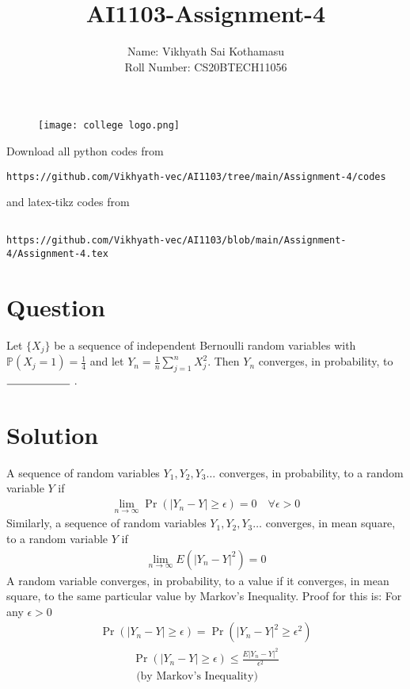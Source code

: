 \documentclass[journal,12pt,twocolumn]{IEEEtran}
\begin{document}
\title{AI1103-Assignment-4}
\author{Name: Vikhyath Sai Kothamasu\\Roll Number: CS20BTECH11056}
\maketitle
\newpage
\bigskip
\renewcommand{\thefigure}{\theenumi}
\renewcommand{\thetable}{\theenumi}

\begin{figure} [h]
    \texttt{[image: college logo.png]}
\end{figure}

Download all python codes from 
\begin{lstlisting}
https://github.com/Vikhyath-vec/AI1103/tree/main/Assignment-4/codes
\end{lstlisting}
%
and latex-tikz codes from 
%
\begin{lstlisting}

https://github.com/Vikhyath-vec/AI1103/blob/main/Assignment-4/Assignment-4.tex
\end{lstlisting}
\section*{Question}
Let $\{X_j\}$ be a sequence of independent Bernoulli random variables with $\mathbb{P}(X_j=1) = \frac{1}{4}$ and let $Y_n = \frac{1}{n} \sum_{j=1}^{n}X_j^2$. Then $Y_n$ converges, in probability, to $\rule{2cm}{0.15mm}$ .

\section*{Solution}
A sequence of random variables $Y_1,Y_2,Y_3\hdots$ converges, in probability, to a random variable $Y$ if
\begin{align}
    \lim_{n\rightarrow \infty}\Pr{(|Y_n-Y|\geq \epsilon)} = 0 \quad \forall \epsilon >0
\end{align}
Similarly, a sequence of random variables $Y_1,Y_2,Y_3\hdots$ converges, in mean square, to a random variable $Y$ if
\begin{align}
    \lim_{n\rightarrow \infty} E(|Y_n-Y|^2) = 0 
\end{align}
A random variable converges, in probability, to a value if it converges, in mean square, to the same particular value by Markov's Inequality. Proof for this is: For any $\epsilon > 0$
\begin{align}
    \Pr{(|Y_n-Y|\geq \epsilon)} = \Pr{(|Y_n-Y|^2\geq \epsilon^2)}
\end{align}
\begin{multline}
    \Pr{(|Y_n-Y|\geq \epsilon)}  \leq \frac{E|Y_n-Y|^2}{\epsilon^2} 
    \\\text{ (by Markov's Inequality)}
\end{multline}
 
\end{document}
